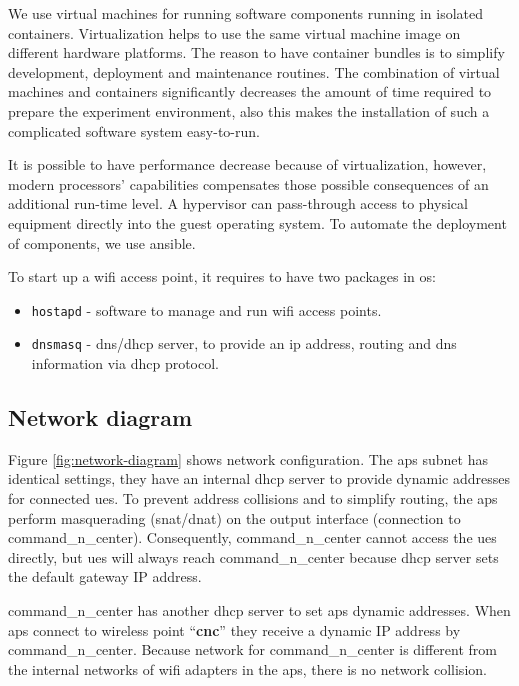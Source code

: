 We use virtual machines for running software components running in isolated containers. Virtualization helps to use the same virtual machine image on different hardware platforms. The reason to have container bundles is to simplify development, deployment and maintenance routines. The combination of virtual machines and containers significantly decreases the amount of time required to prepare the experiment environment, also this makes the installation of such a complicated software system easy-to-run.

It is possible to have performance decrease because of virtualization, however, modern processors' capabilities \cite{amd-v,intel-vt} compensates those possible consequences of an additional run-time level. A hypervisor can pass-through access to physical equipment directly into the guest operating system. To automate the deployment of components, we use \gls{ansible}. 

To start up a \gls{wifi} access point, it requires to have two packages in \acrshort{os}:

\begin{itemize}
	\tightlist
	\item
	\texttt{hostapd} - software to manage and run \gls{wifi} access points.
	\item
	\texttt{dnsmasq} - \acrshort{dns}/\acrshort{dhcp} server, to provide an \acrshort{ip} address, routing
	and \acrshort{dns} information via \acrshort{dhcp} protocol.
\end{itemize}

\subsection{Network diagram}\label{network-diagram}


Figure \ref{fig:network-diagram} shows network configuration. The \glspl{ap} subnet has identical settings, they have an internal \gls{dhcp} server to provide dynamic addresses for connected \glspl{ue}. To prevent address collisions and to simplify routing, the \glspl{ap} perform masquerading (\acrshort{snat}/\acrshort{dnat}) on the output interface (connection to \gls{command_n_center}). Consequently, \gls{command_n_center} cannot access the \glspl{ue} directly, but \glspl{ue} will always reach \gls{command_n_center} because \acrshort{dhcp} server sets the default gateway IP address.

\gls{command_n_center} has another \acrshort{dhcp} server to set \glspl{ap} dynamic addresses. When \glspl{ap} connect to wireless point
``\textbf{cnc}'' they receive a dynamic IP address by \gls{command_n_center}.  Because network for \gls{command_n_center} is different from the internal networks of \gls{wifi} adapters in the \glspl{ap}, there is no network collision.


